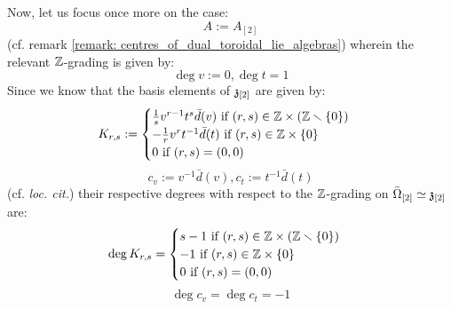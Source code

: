 \begin{remark}
            Now, let us focus once more on the case:
                $$A := A_{[2]}$$
            (cf. remark \ref{remark: centres_of_dual_toroidal_lie_algebras}) wherein the relevant $\mathbb{Z}$-grading is given by:
                $$\deg v := 0, \deg t = 1$$
            Since we know that the basis elements of $\mathfrak{z}_{[2]}$ are given by:
                $$
                    K_{r, s} :=
                    \begin{cases}
                        \text{$\frac1s v^{r - 1} t^s \bar{d}(v)$ if $(r, s) \in \Z \x (\Z \setminus \{0\})$}
                        \\
                        \text{$-\frac1r v^r t^{-1} \bar{d}(t)$ if $(r, s) \in \Z \x \{0\}$}
                        \\
                        \text{$0$ if $(r, s) = (0, 0)$}
                    \end{cases}
                $$
                $$c_v := v^{-1} \bar{d}(v), c_t := t^{-1} \bar{d}(t)$$
            (cf. \textit{loc. cit.}) their respective degrees with respect to the $\mathbb{Z}$-grading on $\bar{\Omega}_{[2]} \simeq \mathfrak{z}_{[2]}$ are:
                $$
                    \deg K_{r, s} =
                    \begin{cases}
                        \text{$s - 1$ if $(r, s) \in \Z \x (\Z \setminus \{0\})$}
                        \\
                        \text{$-1$ if $(r, s) \in \Z \x \{0\}$}
                        \\
                        \text{$0$ if $(r, s) = (0, 0)$}
                    \end{cases}
                $$
                $$\deg c_v = \deg c_t = -1$$
        \end{remark}

